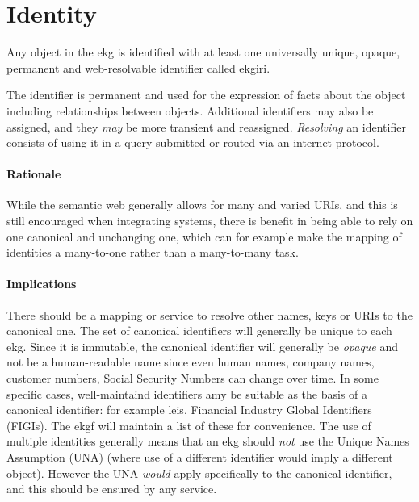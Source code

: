 \section{Identity}\label{sec:ekg-principles-identity}

Any object in the \gls{ekg} is identified with at least one universally unique, opaque, 
permanent and web-resolvable identifier called \gls{ekgiri}.

The identifier is permanent and used for the expression of facts about the object including relationships between objects. 
Additional identifiers may also be assigned, and they \textit{may} be more transient and reassigned.
\textit{Resolving} an identifier consists of using it in a query submitted or routed via an internet protocol.

\paragraph{Rationale}

While the semantic web generally allows for many and varied URIs, and this is still encouraged when integrating systems, 
there is benefit in being able to rely on one canonical and unchanging one, 
which can for example make the mapping of identities a many-to-one rather than a many-to-many task.

\paragraph{Implications}

There should be a mapping or service to resolve other names, keys or URIs to the canonical one. 
The set of canonical identifiers will generally be unique to each \gls{ekg}.
Since it is immutable, the canonical identifier will generally be \textit{opaque} 
and not be a human-readable name since even human names, company names, customer numbers, Social Security Numbers 
can change over time. 
In some specific cases, well-maintaind identifiers amy be suitable as the basis of a canonical identifier: 
for example \glspl{lei}, Financial Industry Global Identifiers (FIGIs). 
The \gls{ekgf} will maintain a list of these for convenience.
The use of multiple identities generally means that an \gls{ekg} should \textit{not} 
use the Unique Names Assumption (UNA) (where use of a different identifier would imply a different object). 
However the UNA \textit{would} apply specifically to the canonical identifier, and this should be ensured by any service.
  
